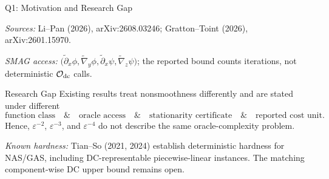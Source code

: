 \documentclass[10pt]{beamer}
\begin{document}
\begin{frame}{Q1: Motivation and Research Gap}
\begin{tabular}
\bottomrule
\end{tabular}

\vspace{0.4mm}
{\tiny\textit{Sources:} Li--Pan (2026), arXiv:2608.03246; Gratton--Toint
(2026), arXiv:2601.15970.\par}
\vspace{0.4mm}
{\tiny
\textit{SMAG access: }
$\bigl(\widetilde{\partial}_x\phi,\widetilde{\nabla}_y\phi,
\widetilde{\partial}_x\psi,\widetilde{\nabla}_z\psi\bigr)$;
the reported bound counts iterations, not deterministic
$\mathcal O_{\rm dc}$ calls.\par}

\vspace{1mm}
\begin{block}{Research Gap}
Existing results treat nonsmoothness differently and are stated under different
\[
\text{function class}
\quad\&\quad
\text{oracle access}
\quad\&\quad
\text{stationarity certificate}
\quad\&\quad
\text{reported cost unit}.
\]
Hence, $\varepsilon^{-2}$, $\varepsilon^{-3}$, and
$\varepsilon^{-4}$ do not describe the same oracle-complexity problem.

\vspace{0.3mm}
{\tiny
\textit{Known hardness:} Tian--So (2021, 2024) establish deterministic
hardness for NAS/GAS, including DC-representable piecewise-linear
instances. The matching component-wise DC upper bound remains open.\par}
\end{block}
\end{frame}
\end{document}
